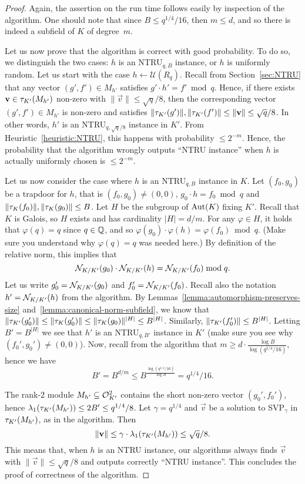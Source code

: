 \begin{proof}
Again, the assertion on the run time follows easily by inspection of the algorithm. One should note that since $B \leq q^{1/4}/16$, then $m \leq d$, and so there is indeed a subfield of $K$ of degree~$m$.

Let us now prove that the algorithm is correct with good probability. 
To do so, we distinguish the two cases: $h$ is an NTRU$_{q,B}$ instance, or $h$ is uniformly random. Let us start with the case $h \leftarrow \mathcal{U}(R_q)$. Recall from Section~\ref{sec:NTRU} that any vector $(g',f') \in M_{h'}$ satisfies $g' \cdot h' = f' \bmod q$. Hence, if there exists $\mathbf v \in \tau_{K'}(M_{h'})$ non-zero with $\|\vec v\| \leq \sqrt{q}/8$, then the corresponding vector $(g',f') \in M_{h'}$ is non-zero and satisfies $\|\tau_{K'}(g')\|, \|\tau_{K'}(f')\| \leq \|\mathbf v\| \leq \sqrt{q}/8$. In other words, $h'$ is an NTRU$_{q,\sqrt{q}/8}$ instance in $K'$. From Heuristic~\ref{heuristic:NTRU}, this happens with probability $\leq 2^{-m}$. Hence, the probability that the algorithm wrongly outputs ``NTRU instance'' when $h$ is actually uniformly chosen is $\leq 2^{-m}$.

Let us now consider the case where $h$ is an NTRU$_{q,B}$ instance in $K$.
Let $(f_0,g_0)$ be a trapdoor for $h$, that is $(f_0, g_0) \neq (0,0)$, $g_0 \cdot h = f_0 \bmod q$ and $\|\tau_K(f_0)\|,\|\tau_K(g_0)\| \leq B$.
Let $H$ be the subgroup of $\operatorname{Aut}(K)$ fixing $K'$. Recall that $K$ is Galois, so $H$ exists and has cardinality $|H| = d/m$. For any $\varphi \in H$, it holds that $\varphi(q) = q$ since $q \in \mathbb{Q}$, and so $\varphi(g_0) \cdot \varphi(h) = \varphi(f_0) \bmod q$. (Make sure you understand why $\varphi(q) = q$ was needed here.) By definition of the relative norm, this implies that
\[ \mathcal{N}_{K/K'}(g_0) \cdot \mathcal{N}_{K/K'}(h) = \mathcal{N}_{K/K'}(f_0) \bmod q.\]
Let us write $g_0' = \mathcal{N}_{K/K'}(g_0)$ and $f_0' = \mathcal{N}_{K/K'}(f_0)$. Recall also the notation $h' = \mathcal{N}_{K/K'}(h)$ from the algorithm. By Lemmas~\ref{lemma:automorphism-preserves-size} and~\ref{lemma:canonical-norm-subfield}, we know that $\|\tau_{K'}(g_0')\| \leq \|\tau_{K}(g_0')\| \leq \|\tau_{K}(g_0)\|^{|H|} \leq B^{|H|}$. Similarly, $\|\tau_{K'}(f_0')\|\leq B^{|H|}$. Letting $B' = B^{|H|}$ we see that $h'$ is an NTRU$_{q,B'}$ instance in $K'$ (make sure you see why $(f_0', g_0') \neq (0,0)$). Now, recall from the algorithm that $m \geq d \cdot \frac{\log B}{\log(q^{1/4}/16)}$, hence we have
\[B' = B^{d/m} \leq B^{\frac{\log(q^{1/4}/16)}{\log B}} = q^{1/4}/16.\]

The rank-2 module $M_{h'} \subseteq \mathcal{O}_{K'}^2$ contains the short non-zero vector $(g_0',f_0')$, hence $\lambda_1(\tau_{K'}(M_{h'})) \leq 2B' \leq q^{1/4}/8$.
%
Let $\gamma = q^{1/4}$ and $\vec v$ be a solution to SVP$_\gamma$ in $\tau_{K'}(M_{h'})$, as in the algorithm. Then 
\[\|\mathbf v\| \leq \gamma \cdot \lambda_1(\tau_{K'}(M_{h'})) \leq \sqrt{q}/8.\]
This means that, when $h$ is an NTRU instance, our algorithms always finds $\vec v$ with $\|\vec v\| \leq \sqrt{q}/8$ and outputs correctly ``NTRU instance''.
This concludes the proof of correctness of the algorithm.
\end{proof}


